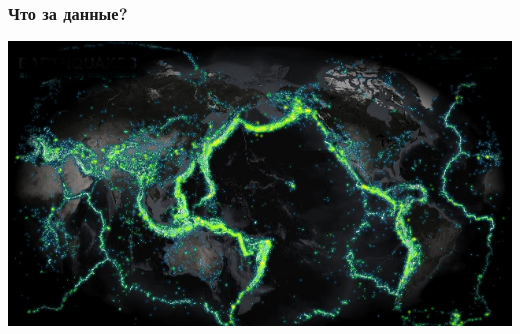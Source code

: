 \documentclass[russian, 10pt]{beamer}
\begin{document}
\begin{frame}
\frametitle{Что за данные?}
\centering
\includegraphics[scale=0.5]{images/earth.png}
\end{frame}
\end{document}
